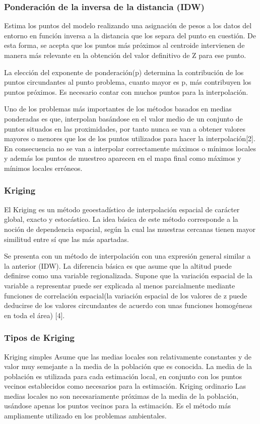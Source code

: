 \subsubsection{Ponderación de la inversa de la distancia (IDW)}
Estima los puntos del modelo realizando una asignación de pesos a los datos
del entorno en función inversa a la distancia que los separa del punto en
cuestión. De esta forma, se acepta  que  los puntos más próximos al centroide
intervienen de manera más relevante en la obtención del valor definitivo
de Z para ese punto.

La elección del exponente de ponderación(p) determina la contribución de
los puntos circundantes al punto problema, cuanto mayor es p, más contribuyen
los puntos próximos. Es necesario contar con muchos puntos para la interpolación.

Uno de los problemas más importantes de los métodos basados en medias
ponderadas es que, interpolan basándose en el valor medio de un conjunto
de puntos situados en las proximidades, por tanto nunca se van a obtener
valores mayores o menores que los de los puntos utilizados para hacer la
interpolación[2]. En consecuencia no se van a interpolar correctamente
máximos o mínimos locales y además los puntos de muestreo aparecen en el
mapa final como máximos y mínimos locales erróneos.

\subsubsection{Kriging}
El Kriging es un método geoestadístico de interpolación espacial de carácter
global, exacto y estocástico. La idea básica de este método corresponde a
la noción de dependencia espacial, según la cual las muestras cercanas
tienen mayor similitud entre sí que las más apartadas\cite{NINO2011}.

Se presenta con un método de interpolación con una expresión general
similar a la anterior (IDW). La diferencia básica es que asume que la
altitud puede definirse como una variable regionalizada. Supone que la
variación espacial de la variable a representar puede ser explicada al
menos parcialmente mediante funciones de correlación espacial(la variación
espacial de los valores de z puede deducirse de los valores circundantes
de acuerdo con unas funciones homogéneas en toda el área) [4].

\subsubsection{Tipos de Kriging}
Kriging simples
Asume que las medias locales son relativamente constantes y de valor muy
semejante a la media de la población que es conocida. La media de la
población es utilizada para cada estimación local, en conjunto con los
puntos vecinos establecidos como necesarios para la estimación.
Kriging ordinario
Las medias locales no son necesariamente próximas de la media de la población,
usándose apenas los puntos vecinos para la estimación. Es el método más
ampliamente utilizado en los problemas ambientales.

